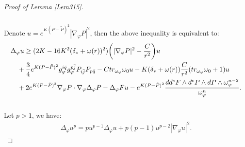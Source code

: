 \documentclass[10pt,a4paper]{amsart}
\begin{document}
\begin{proof}[Proof of Lemma \ref{Lem315}]
\begin{align}
\end{align}\\
Denote $u=e^{K(P-\tilde{P})^2}|\nabla_{\varphi}P|^2$,  then the above inequality is equivalent to:
\begin{align}\label{4.133New}
	&\Delta_{\varphi}u  \ge  (2K-16K^2(\delta_*+\omega(r))^2)\bigg( |\nabla_\varphi P|^2 - \frac{C}{r^2}\bigg) u    \notag \\
	&\quad +\frac{3}{4}e^{K(P-\tilde P)^2} g_{\varphi}^{i\bar{q}}g_{\varphi}^{p\bar{j}}P_{i\bar{j}}P_{p\bar{q}} -C tr_{\omega_{\varphi}}\omega_0 u -K(\delta_*+\omega(r)) \frac{C}{r^2} (tr_{\omega_{\varphi}}\omega_0+1) u \notag\\
	&\quad+2e^{K(P-\tilde P)^2}\nabla_{\varphi}P\cdot\nabla_{\varphi}\Delta_{\varphi}P - \Delta_{\varphi}Fu - e^{K(P-\tilde P)^2}\frac{dd^cF\wedge d^cP\wedge dP\wedge \omega_{\varphi}^{n-2}}{\omega_{\varphi}^n}.
\end{align}\\

\noindent
Let $p>1$,  we have:
\begin{align}
	\Delta_\varphi u^p = p u^{p-1}\Delta_\varphi u+p(p-1)u^{p-2}|\nabla_\varphi u|^2.
\end{align}


\end{proof}
\end{document}

